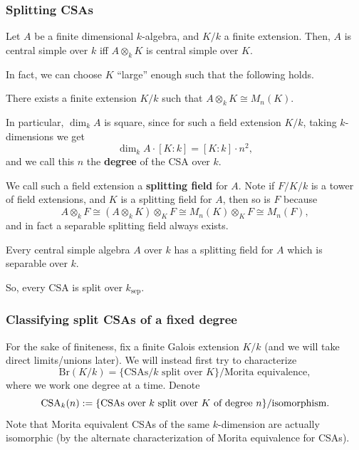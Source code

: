 \documentclass[12pt]{article}
\newcommand{\sep}{\text{sep}}
\newcommand{\Br}{\mathrm{Br}}
\begin{document}
\subsubsection{Splitting CSAs}

\begin{prop}
    Let $A$ be a finite dimensional $k$-algebra, and $K/k$ a finite extension. Then, $A$ is central simple over $k$ iff $A\otimes_k K$ is central simple over $K$.
\end{prop}

In fact, we can choose $K$ ``large'' enough such that the following holds.

\begin{prop}
    There exists a finite extension $K/k$ such that $A\otimes_k K \cong M_n(K)$.
\end{prop}

In particular, $\dim_k A$ is square, since for such a field extension $K/k$, taking $k$-dimensions we get
\[\dim_k A \cdot [K: k] = [K: k]\cdot n^2,\]
and we call this $n$ the \textbf{degree} of the CSA over $k$.

We call such a field extension a \textbf{splitting field} for $A$. Note if $F/K/k$ is a tower of field extensions, and $K$ is a splitting field for $A$, then so is $F$ because
\[A\otimes_k F \cong (A\otimes_k K) \otimes_K F \cong M_n(K)\otimes_K F \cong M_n(F),\]
and in fact a separable splitting field always exists.

\begin{prop}\label{CSA_eventually_split}
    Every central simple algebra $A$ over $k$ has a splitting field for $A$ which is separable over $k$.
\end{prop}

So, every CSA is split over $k_\sep$.


\subsubsection{Classifying split CSAs of a fixed degree}

For the sake of finiteness, fix a finite Galois extension $K/k$ (and we will take direct limits/unions later). We will instead first try to characterize
\[\Br(K/k) = \{\text{CSAs$/k$ split over $K$}\}/\text{Morita equivalence},\]
where we work one degree at a time. Denote
\[\mathrm{CSA}_k(n) := \{\text{CSAs over $k$ split over $K$ of degree $n$}\}/\text{isomorphism}.\]
Note that Morita equivalent CSAs of the same $k$-dimension are actually isomorphic (by the alternate characterization of Morita equivalence for CSAs).
\end{document}
